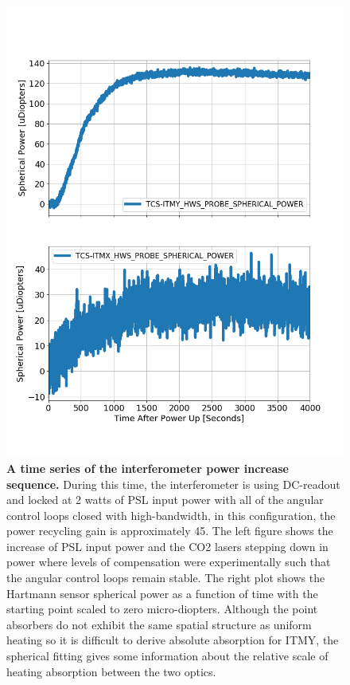 \begin{figure}[ht]
	\includegraphics[width=0.35\textheight]{../Figures/1231726400HWS_powerup.png}
	\caption[A time series of the interferometer power increase sequence.] 
	{\textbf{A time series of the interferometer power increase sequence.} During this time, the interferometer is using DC-readout and locked at 2 watts of PSL input power with all of the angular control loops closed with high-bandwidth, in this configuration, the power recycling gain is approximately 45.  The left figure shows the increase of PSL input power and the CO2 lasers stepping down in power where levels of compensation were experimentally such that the angular control loops remain stable.  The right plot shows the Hartmann sensor spherical power as a function of time with the starting point scaled to zero micro-diopters.  Although the point absorbers do not exhibit the same spatial structure as uniform heating so it is difficult to derive absolute absorption for ITMY, the spherical fitting gives some information about the relative scale of heating absorption between the two optics.}
	\label{fig:pwr_up_time}
\end{figure}


